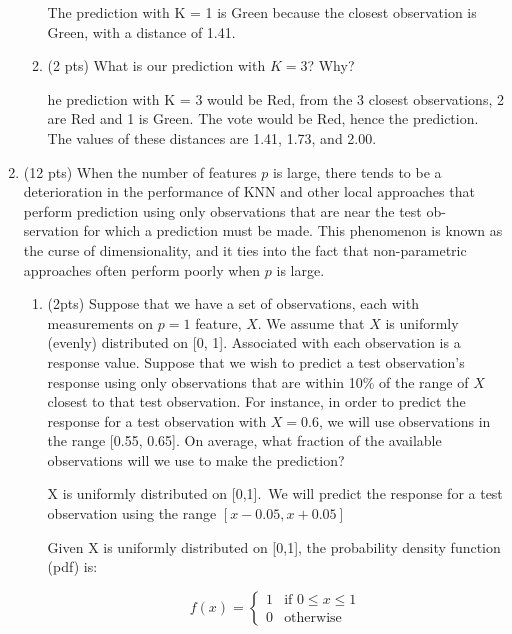 \documentclass[a4paper]{article}
\theoremstyle{definition}
\newenvironment{soln}{
    \leavevmode\color{blue}\ignorespaces
}{}
\begin{document}
\begin{enumerate}
\begin{enumerate}
	\begin{soln}  The prediction with K = 1 is Green because the closest observation is Green, with a distance of 1.41. \end{soln}
	
	\item (2 pts) What is our prediction with $K=3$? Why?
	
	\begin{soln}  he prediction with K = 3 would be Red, from the 3 closest observations, 2 are Red and 1 is Green. The vote would be Red, hence the prediction. The values of these distances are 1.41, 1.73, and 2.00. \end{soln}

\end{enumerate}

\item (12 pts) When the number of features $p$ is large, there tends to be a deterioration in the performance of KNN and other local approaches that perform prediction using only observations that are near the test ob- servation for which a prediction must be made. This phenomenon is known as the curse of dimensionality, and it ties into the fact that non-parametric approaches often perform poorly when $p$ is large.

\begin{enumerate}
	\item (2pts) Suppose that we have a set of observations, each with measurements on $p=1$ feature, $X$. We assume that $X$ is uniformly (evenly) distributed on [0, 1]. Associated with each observation is a response value. Suppose that we wish to predict a test observation’s response using only observations that are within 10\% of the range of $X$ closest to that test observation. For instance, in order to predict the response for a test observation with $X=0.6$, we will use observations in the range [0.55, 0.65]. On average, what fraction of the available observations will we use to make the prediction?
	
	\begin{soln}  X is uniformly distributed on [0,1].\
		We will predict the response for a test observation using the range $[x - 0.05, x + 0.05]$
		
		Given X is uniformly distributed on [0,1], the probability density function (pdf) is:
		
		$$
		f(x) = \begin{cases}
		1 & \text{if } 0 \leq x \leq 1 \\
		0 & \text{otherwise}
		\end{cases}
		$$
		

\end{soln}
\end{enumerate}
\end{enumerate}
\end{document}
